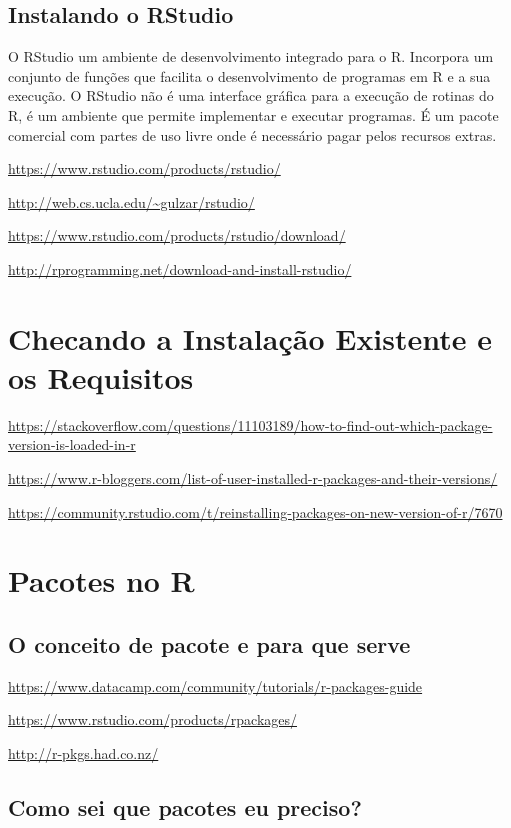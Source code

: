\documentclass[12pt,a4paper,oneside]{erdc}
\begin{document}
\subsection{Instalando o RStudio}

O RStudio um ambiente de desenvolvimento integrado para o R. Incorpora um conjunto de funções que facilita o desenvolvimento de programas em R e a sua execução. O RStudio não é uma interface gráfica para a execução de rotinas do R, é um ambiente que permite implementar e executar programas. É um pacote comercial com partes de uso livre onde é necessário pagar pelos recursos extras.


\url{https://www.rstudio.com/products/rstudio/}

\url{http://web.cs.ucla.edu/~gulzar/rstudio/}

\url{https://www.rstudio.com/products/rstudio/download/}

\url{http://rprogramming.net/download-and-install-rstudio/}


\section{Checando a Instalação Existente e os Requisitos}


\url{https://stackoverflow.com/questions/11103189/how-to-find-out-which-package-version-is-loaded-in-r}

\url{https://www.r-bloggers.com/list-of-user-installed-r-packages-and-their-versions/}

\url{https://community.rstudio.com/t/reinstalling-packages-on-new-version-of-r/7670}


\section{Pacotes no R}

\subsection{O conceito de pacote e para que serve}

\url{https://www.datacamp.com/community/tutorials/r-packages-guide}

\url{https://www.rstudio.com/products/rpackages/}

\url{http://r-pkgs.had.co.nz/}

\subsection{Como sei que pacotes eu preciso?}
\end{document}
